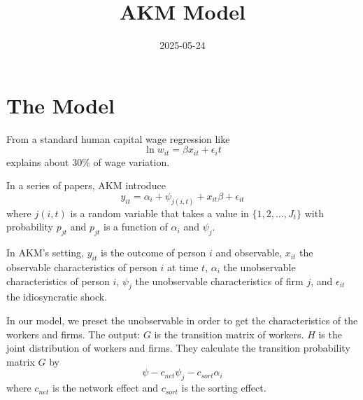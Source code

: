 \documentclass{article}
\begin{document}
 

\title{AKM Model}
\author{2025-05-24}
\date{}
\maketitle


\section{The Model}
From a standard human capital wage regression like 
$$ \ln w_{it} = \beta x_{it} + \epsilon _i t $$
explains about 30\% of wage variation.

In a series of papers, AKM introduce
\begin{equation}
    y_{it} = \alpha _i + \psi _{j(i,t)} + x_{it} \beta + \epsilon_{it}
\end{equation}
where $j(i,t)$ is a random variable that takes a value in $\{1,2,\dots,J_t\}$ with probability $p_{jt}$ and $p_{jt}$ is a function of $\alpha_i$ and $\psi_j$.

In AKM's setting, $y_{it}$ is the outcome of person $i$ and observable, $x_{it}$ the observable characteristics of person $i$ at time $t$, 
$\alpha_i$ the unobservable characteristics of person $i$, $\psi_j$ the unobservable characteristics of firm $j$, and $\epsilon_{it}$ the idiosyncratic shock.

In our model, we preset the unobservable in order to get the characteristics of the workers and firms. 
The output: $G$ is the transition matrix of workers. $H$ is the joint distribution of workers and firms. 
They calculate the transition probability matrix $G$ by 
$$ \psi - c_{net} \psi_j - c_{sort} \alpha_i $$
where $c_{net}$ is the network effect and $c_{sort}$ is the sorting effect. 
\end{document}

